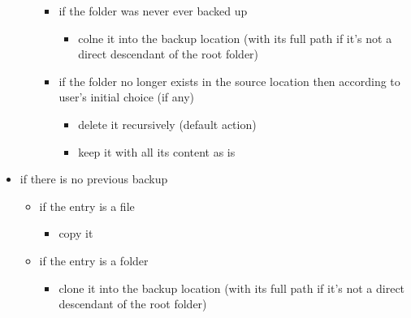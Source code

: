 \documentclass[a4paper]{article}
\begin{document}
\begin{itemize}
\begin{itemize}
\begin{itemize}
\begin{itemize}
                    \end{itemize}
                  \item if the folder was never ever backed up
                    \begin{itemize}
                      \item colne it into the backup location (with its full path if it's not a direct descendant of the root folder)
                    \end{itemize}
                  \item if the folder no longer exists in the source location then according to user's initial choice (if any)
                    \begin{itemize}
                      \item delete it recursively (default action)
                      \item keep it with all its content as is
                    \end{itemize}
                \end{itemize}
            \end{itemize}
          \item if there is no previous backup
            \begin{itemize}
              \item if the entry is a file
                \begin{itemize}
                  \item copy it
                \end{itemize}
              \item if the entry is a folder
                \begin{itemize}
                  \item clone it into the backup location (with its full path if it's not a direct descendant of the root folder)
                \end{itemize}
            \end{itemize}
        \end{itemize}
\end{document}
